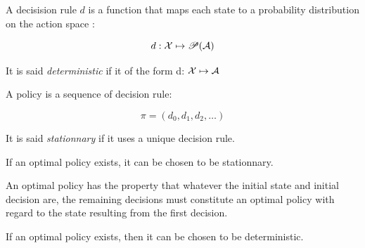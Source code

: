\documentclass[10pt]{beamer}
\begin{document}
\begin{frame}
    \begin{definition}
        A decisision rule $d$ is a function that maps each state to a probability distribution on the action space :
        
        \[ d: \mathcal{X} \mapsto \mathscr{P}(\mathcal{A}) \]
    
        It is said \emph{deterministic} if it of the form d: $\mathcal{X} \mapsto \mathcal{A}$ \\
    \end{definition}
    
    \begin{definition}
        A policy is a sequence of decision rule: 
    
        \[ \pi = (d_0, d_1, d_2, \dots) \]
    
        It is said \emph{stationnary} if it uses a unique decision rule.
    \end{definition}
\end{frame}

\begin{frame}
    \begin{theorem}[Bertsekas, 2007]
        If an optimal policy exists, it can be chosen to be stationnary.
    \end{theorem}
    \begin{proposition}
        An optimal policy has the property that whatever the initial state and initial decision are, the remaining decisions must constitute an optimal policy with regard to the state resulting from the first decision.
    \end{proposition}
    
    \begin{corollary}
        If an optimal policy exists, then it can be chosen to be deterministic.
    \end{corollary}       
\end{frame}
\end{document}
